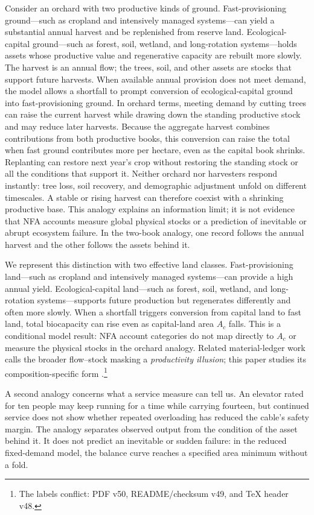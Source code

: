 \documentclass[preprint,12pt,authoryear]{elsarticle}
\begin{document}
Consider an orchard with two productive kinds of ground. Fast-provisioning ground—such as cropland and intensively managed systems—can yield a substantial annual harvest and be replenished from reserve land. Ecological-capital ground—such as forest, soil, wetland, and long-rotation systems—holds assets whose productive value and regenerative capacity are rebuilt more slowly. The harvest is an annual flow; the trees, soil, and other assets are stocks that support future harvests. When available annual provision does not meet demand, the model allows a shortfall to prompt conversion of ecological-capital ground into fast-provisioning ground. In orchard terms, meeting demand by cutting trees can raise the current harvest while drawing down the standing productive stock and may reduce later harvests. Because the aggregate harvest combines contributions from both productive books, this conversion can raise the total when fast ground contributes more per hectare, even as the capital book shrinks. Replanting can restore next year's crop without restoring the standing stock or all the conditions that support it. Neither orchard nor harvesters respond instantly: tree loss, soil recovery, and demographic adjustment unfold on different timescales. A stable or rising harvest can therefore coexist with a shrinking productive base. This analogy explains an information limit; it is not evidence that NFA accounts measure global physical stocks or a prediction of inevitable or abrupt ecosystem failure. In the two-book analogy, one record follows the annual harvest and the other follows the assets behind it.

We represent this distinction with two effective land classes. Fast-provisioning land—such as cropland and intensively managed systems—can provide a high annual yield. Ecological-capital land—such as forest, soil, wetland, and long-rotation systems—supports future production but regenerates differently and often more slowly. When a shortfall triggers conversion from capital land to fast land, total biocapacity can rise even as capital-land area $A_c$ falls. This is a conditional model result: NFA account categories do not map directly to $A_c$ or measure the physical stocks in the orchard analogy. Related material-ledger work calls the broader flow--stock masking a \emph{productivity illusion}; this paper studies its composition-specific form \citep{Abaee2026c}.\footnote{The labels conflict: PDF v50, README/checksum v49, and TeX header v48.}

A second analogy concerns what a service measure can tell us. An elevator rated for ten people may keep running for a time while carrying fourteen, but continued service does not show whether repeated overloading has reduced the cable's safety margin. The analogy separates observed output from the condition of the asset behind it. It does not predict an inevitable or sudden failure: in the reduced fixed-demand model, the balance curve reaches a specified area minimum without a fold.
\end{document}
